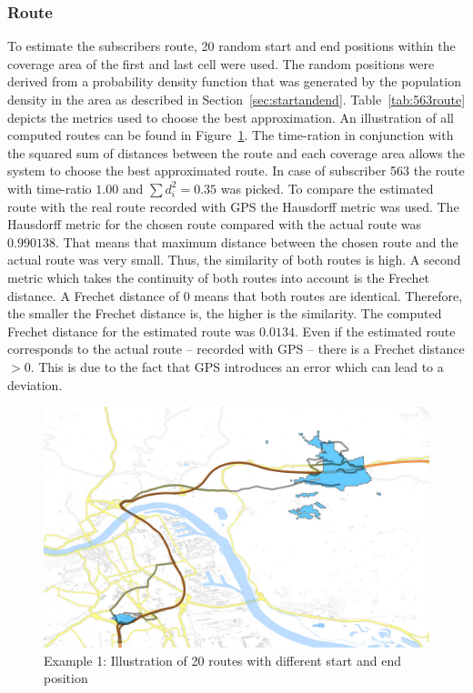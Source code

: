 \documentclass[master,english]{hgbthesis}
\begin{document}
\subsubsection{Route}
To estimate the subscribers route, 20 random start and end positions within the coverage area of the first and last cell were used. The random positions were derived from a probability density function that was generated by the population density in the area as described in Section~\ref{sec:startandend}. Table~\ref{tab:563route} depicts the metrics used to choose the best approximation. An illustration of all computed routes can be found in Figure~\ref{fig:563_routes}. The time-ration in conjunction with the squared sum of distances between the route and each coverage area allows the system to choose the best approximated route. In case of subscriber 563 the route with time-ratio $1.00$ and $\sum {d}_{i}^{2}=0.35$ was picked. To compare the estimated route with the real route recorded with GPS the Hausdorff metric was used. The Hausdorff metric for the chosen route  compared with the actual route was $0.990138 $. That means that maximum distance between the chosen route and the actual route was very small. Thus, the similarity of  both routes is high. A second metric which takes the continuity of both routes into account is the Frechet distance. A Frechet distance of $0$ means that both routes are identical. Therefore, the smaller the Frechet distance is, the higher is the similarity. The computed Frechet distance for the estimated route was $0.0134$. Even if the estimated route corresponds to the actual route -- recorded with GPS -- there is a Frechet distance $>0$. This is due to the fact that GPS introduces an error which can lead to a deviation.
\begin{figure}
\centering
\includegraphics[width=0.7\linewidth]{./images/563_routes}
\caption{Example 1: Illustration of 20 routes with different start and end position}
\label{fig:563_routes}
\end{figure}
\end{document}
